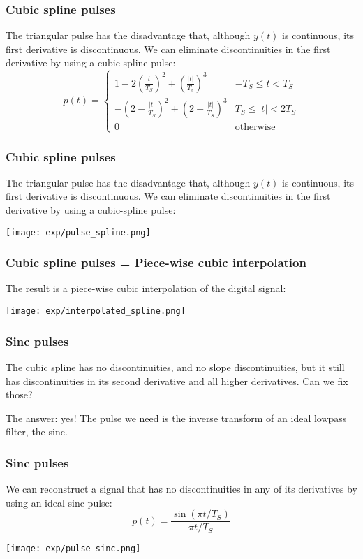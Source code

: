 \documentclass{beamer}
\begin{document}
\begin{frame}
  \frametitle{Cubic spline pulses}

  The triangular pulse has the disadvantage that, although $y(t)$ is continuous, its
  first derivative is discontinuous.  We can eliminate discontinuities in the first derivative
  by using a cubic-spline pulse:
  \begin{displaymath}
    p(t) = \begin{cases}
      1-2\left(\frac{|t|}{T_S}\right)^2 +\left(\frac{|t|}{T_s}\right)^3 & -T_S\le t<T_S\\
      -\left(2-\frac{|t|}{T_S}\right)^2+\left(2-\frac{|t|}{T_S}\right)^3 & T_S\le |t|<2T_S\\
      0 & \mbox{otherwise}
    \end{cases}
  \end{displaymath}

\end{frame}

\begin{frame}
  \frametitle{Cubic spline pulses}

  The triangular pulse has the disadvantage that, although $y(t)$ is continuous, its
  first derivative is discontinuous.  We can eliminate discontinuities in the first derivative
  by using a cubic-spline pulse:
  \centerline{\texttt{[image: exp/pulse\_spline.png]}}  
\end{frame}

\begin{frame}
  \frametitle{Cubic spline pulses = Piece-wise cubic interpolation}

  The result is a  piece-wise cubic interpolation of the digital signal:

  \centerline{\texttt{[image: exp/interpolated\_spline.png]}}  
\end{frame}

\begin{frame}
  \frametitle{Sinc pulses}

  The cubic spline has no discontinuities, and no slope  discontinuities, but it still has
  discontinuities in its second derivative and all higher derivatives.  Can we fix those?

  The answer: yes!  The pulse we need is the inverse transform of an
  ideal lowpass filter, the sinc.
\end{frame}
  
\begin{frame}
  \frametitle{Sinc pulses}

  We can reconstruct a signal that has  no discontinuities in any of its derivatives
  by using an  ideal sinc pulse:
  \begin{displaymath}
    p(t) = \frac{\sin(\pi t/T_S)}{\pi t/T_S}
  \end{displaymath}

  \centerline{\texttt{[image: exp/pulse\_sinc.png]}}  
\end{frame}
\end{document}
